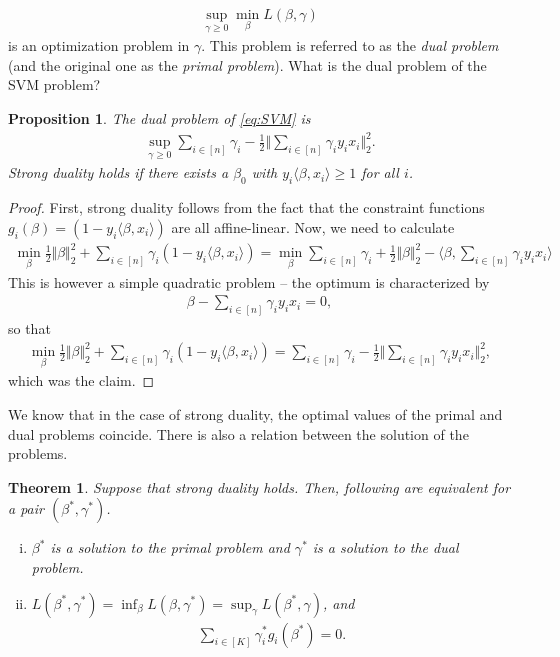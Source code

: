 \documentclass{article}
\newcommand{\sprod}[1]{\langle #1 \rangle}
\newtheorem{theorem}{Theorem}
\newtheorem{prop}{Proposition}
\newcommand{\norm}[1]{\Vert #1 \Vert}
\begin{document}
\begin{align*}
    \sup_{\gamma\geq 0 }\min_{\beta} L(\beta,\gamma)
\end{align*}
is an optimization problem in $\gamma$. This problem is referred to as the \emph{dual problem} (and the original one as the \emph{primal problem}). What is the dual problem of the SVM problem?
\begin{prop}
    The dual problem of \eqref{eq:SVM} is
    \begin{align*}
        \sup_{\gamma \geq 0 } \sum_{i \in [n]} \gamma_i - \tfrac{1}{2} \norm{\sum_{i \in [n]}\gamma_i y_i x_i}_2^2.
    \end{align*}
    Strong duality holds if there exists a $\beta_0$ with $y_i\sprod{\beta,x_i} \geq 1$ for all $i$.
\end{prop}
\begin{proof}
First, strong duality follows from the fact that the constraint functions $g_i(\beta)=(1-y_i\sprod{\beta,x_i})$ are all affine-linear. Now, we need to calculate
    \begin{align*}
        \min_\beta \tfrac{1}{2}\norm{\beta}_2^2 +  \sum_{i \in [n]} \gamma_i(1-y_i\sprod{\beta,x_i}) = \min_{\beta} \sum_{i \in [n]} \gamma_i + \tfrac{1}{2}\norm{\beta}_2^2 - \sprod{\beta, \sum_{i\in [n]}\gamma_i y_i x_i}
    \end{align*}
    This is however a simple quadratic problem -- the optimum is characterized by
    \begin{align*}
        \beta - \sum_{i\in [n]} \gamma_i y_i x_i =0,
    \end{align*}
    so that
    \begin{align*}
        \min_\beta \tfrac{1}{2}\norm{\beta}_2^2 + \sum_{i \in [n]} \gamma_i(1-y_i\sprod{\beta,x_i}) =  \sum_{i \in [n]} \gamma_i - \tfrac{1}{2} \norm{\sum_{i \in [n]}\gamma_i y_i x_i}_2^2,
    \end{align*}
    which was the claim.
\end{proof}

We know that in the case of strong duality, the optimal values of the primal and dual problems coincide. There is also a relation between the solution of the problems.
\begin{theorem}
    Suppose that strong duality holds. Then, following are equivalent for a pair $(\beta^*,\gamma^*)$.
    \begin{enumerate}[(i)]
        \item $\beta^*$ is a solution to the primal problem and $\gamma^*$ is a solution to the dual problem.
        \item $L(\beta^*,\gamma^*) = \inf_{\beta} L(\beta,\gamma^*) = \sup_\gamma L(\beta^*,\gamma)$, and 
            \begin{align}
    \sum_{i \in [K]} \gamma_i^* g_i(\beta^*)=0 \label{eq:slackness}.
    \end{align}
    \end{enumerate}
\end{theorem}
\end{document}
